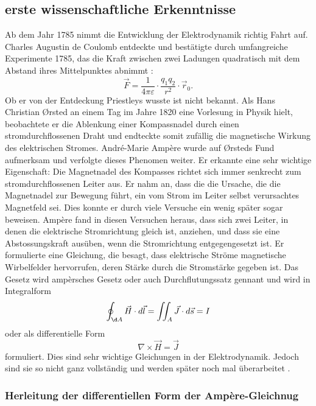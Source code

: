 \subsection{erste wissenschaftliche Erkenntnisse}
Ab dem Jahr 1785 nimmt die Entwicklung der Elektrodynamik richtig Fahrt auf.
Charles Augustin de Coulomb entdeckte und bestätigte durch umfangreiche Experimente 1785, das die Kraft zwischen zwei Ladungen quadratisch mit dem Abstand ihres Mittelpunktes abnimmt \cite{maxwell:Charles-Augustin_de_Coulomb}:
\[
\vec{F}
=
\frac{1}{4 \pi \varepsilon}
\cdot
\frac{q_1 q_2}{r^2}
\cdot
\vec{r}_0.
\]
Ob er von der Entdeckung Priestleys wusste ist nicht bekannt.
Als Hans Christian Ørsted an einem Tag im Jahre 1820 eine Vorlesung in Physik hielt, beobachtete er die Ablenkung einer Kompassnadel durch einen stromdurchflossenen Draht und endteckte somit zufällig die magnetische Wirkung des elektrischen Stromes.
André-Marie Ampère wurde auf Ørsteds Fund aufmerksam und verfolgte dieses Phenomen weiter.
Er erkannte eine sehr wichtige Eigenschaft: Die Magnetnadel des Kompasses richtet sich immer senkrecht zum stromdurchflossenen Leiter aus.
Er nahm an, dass die die Ursache, die die Magnetnadel zur Bewegung führt, ein vom Strom im Leiter selbst verursachtes Magnetfeld sei.
Dies konnte er durch viele Versuche ein wenig später sogar beweisen.
Ampère fand in diesen Versuchen heraus, dass sich zwei Leiter, in denen die elektrische Stromrichtung gleich ist, anziehen, und dass sie eine Abstossungskraft ausüben, wenn die Stromrichtung entgegengesetzt ist.
Er formulierte eine Gleichung, die besagt, dass elektrische Ströme magnetische Wirbelfelder hervorrufen, deren Stärke durch die Stromstärke gegeben ist.
Das Gesetz wird ampèrsches Gesetz oder auch Durchflutungssatz gennant und wird in Integralform
\[
\oint_{\d A}
\vec{H}
\cdot
d\vec{l}
=
\iint_{A}
\vec{J}
\cdot
d\vec{s}
=
I
\]
oder als differentielle Form
\[
\nabla
\times
\vec{H}
=
\vec{J}
\]
formuliert.
Dies sind sehr wichtige Gleichungen in der Elektrodynamik.
Jedoch sind sie so nicht ganz vollständig und werden später noch mal überarbeitet \cite{maxwell:Hans_Christian_Ørsted}\cite{maxwell:André-Marie_Ampère}.

\subsubsection{Herleitung der differentiellen Form der Ampère-Gleichnug}


